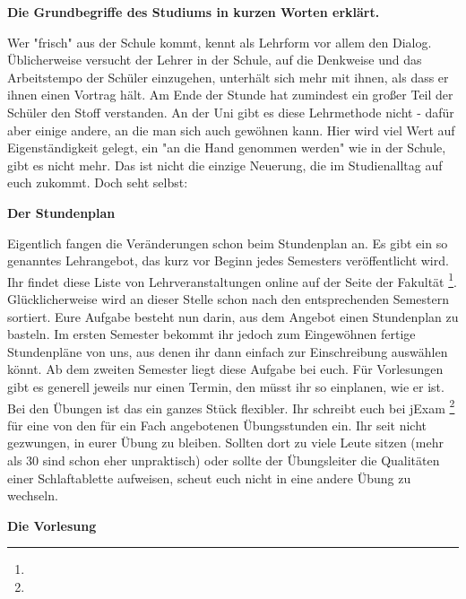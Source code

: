 
\textbf{Die Grundbegriffe des Studiums in kurzen Worten erklärt.}

Wer "frisch" aus der Schule kommt, kennt als Lehrform vor allem den Dialog.
Üblicherweise versucht der Lehrer in der Schule, auf die Denkweise und das Arbeitstempo der Schüler einzugehen, unterhält sich mehr mit ihnen, als dass er ihnen einen Vortrag hält.
Am Ende der Stunde hat zumindest ein großer Teil der Schüler den Stoff verstanden.
An der Uni gibt es diese Lehrmethode nicht - dafür aber einige andere, an die man sich auch gewöhnen kann.
Hier wird viel Wert auf Eigenständigkeit gelegt, ein "an die Hand genommen werden" wie in der Schule, gibt es nicht mehr.
Das ist nicht die einzige Neuerung, die im Studienalltag auf euch zukommt.
Doch seht selbst:

\textbf{Der Stundenplan}

Eigentlich fangen die Veränderungen schon beim Stundenplan an.
Es gibt ein so genanntes Lehrangebot, das kurz vor Beginn jedes Semesters veröffentlicht wird.
Ihr findet diese Liste von Lehrveranstaltungen online auf der Seite der Fakultät \footnote{}.
Glücklicherweise wird an dieser Stelle schon nach den entsprechenden Semestern sortiert.
Eure Aufgabe besteht nun darin, aus dem Angebot einen Stundenplan zu basteln.
Im ersten Semester bekommt ihr jedoch zum Eingewöhnen fertige Stundenpläne von uns, aus denen ihr dann einfach zur Einschreibung auswählen könnt.
Ab dem zweiten Semester liegt diese Aufgabe bei euch.
Für Vorlesungen gibt es generell jeweils nur einen Termin, den müsst ihr so einplanen, wie er ist.
Bei den Übungen ist das ein ganzes Stück flexibler.
Ihr schreibt euch bei jExam \footnote{} für eine von den für ein Fach angebotenen Übungsstunden ein.
Ihr seit nicht gezwungen, in eurer Übung zu bleiben.
Sollten dort zu viele Leute sitzen (mehr als 30 sind schon eher unpraktisch) oder sollte der Übungsleiter die Qualitäten einer Schlaftablette aufweisen, scheut euch nicht in eine andere Übung zu wechseln.

\textbf{Die Vorlesung}

